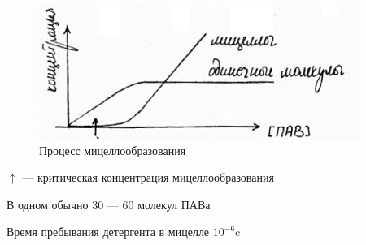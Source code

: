 \begin{lecture}
	\begin{lecSection}	
	\begin{figure}
    	\begin{center}
			\includegraphics[width=\linewidth]{lecture_07/pic9}
     	\end{center}
     \caption{Процесс мицеллообразования}
	\end{figure}
	\par $\uparrow$ --- критическая концентрация мицеллообразования
	\par В одном обычно 30 --- 60 молекул ПАВа
	\par Время пребывания детергента в мицелле $10^{-6} \text{c}$
	
	\end{lecSection}
		
\end{lecture}
